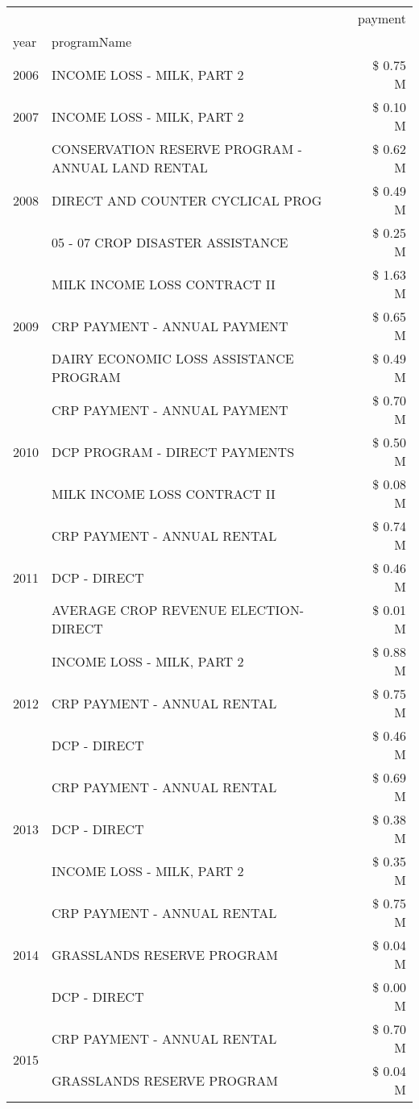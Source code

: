 \begin{tabular}{llr}
\toprule
 &  & payment \\
year & programName &  \\
\midrule
2006 & INCOME LOSS - MILK, PART 2 & \$ 0.75 M \\
\cline{1-3}
2007 & INCOME LOSS - MILK, PART 2 & \$ 0.10 M \\
\cline{1-3}
\multirow[t]{3}{*}{2008} & CONSERVATION RESERVE PROGRAM - ANNUAL LAND RENTAL & \$ 0.62 M \\
 & DIRECT AND COUNTER CYCLICAL PROG & \$ 0.49 M \\
 & 05 - 07 CROP DISASTER ASSISTANCE & \$ 0.25 M \\
\cline{1-3}
\multirow[t]{3}{*}{2009} & MILK INCOME LOSS CONTRACT II & \$ 1.63 M \\
 & CRP PAYMENT - ANNUAL PAYMENT & \$ 0.65 M \\
 & DAIRY ECONOMIC LOSS ASSISTANCE PROGRAM & \$ 0.49 M \\
\cline{1-3}
\multirow[t]{3}{*}{2010} & CRP PAYMENT - ANNUAL PAYMENT & \$ 0.70 M \\
 & DCP PROGRAM - DIRECT PAYMENTS & \$ 0.50 M \\
 & MILK INCOME LOSS CONTRACT II & \$ 0.08 M \\
\cline{1-3}
\multirow[t]{3}{*}{2011} & CRP PAYMENT - ANNUAL RENTAL & \$ 0.74 M \\
 & DCP - DIRECT & \$ 0.46 M \\
 & AVERAGE CROP REVENUE ELECTION-DIRECT & \$ 0.01 M \\
\cline{1-3}
\multirow[t]{3}{*}{2012} & INCOME LOSS - MILK, PART 2 & \$ 0.88 M \\
 & CRP PAYMENT - ANNUAL RENTAL & \$ 0.75 M \\
 & DCP - DIRECT & \$ 0.46 M \\
\cline{1-3}
\multirow[t]{3}{*}{2013} & CRP PAYMENT - ANNUAL RENTAL & \$ 0.69 M \\
 & DCP - DIRECT & \$ 0.38 M \\
 & INCOME LOSS - MILK, PART 2 & \$ 0.35 M \\
\cline{1-3}
\multirow[t]{3}{*}{2014} & CRP PAYMENT - ANNUAL RENTAL & \$ 0.75 M \\
 & GRASSLANDS RESERVE PROGRAM & \$ 0.04 M \\
 & DCP - DIRECT & \$ 0.00 M \\
\cline{1-3}
\multirow[t]{3}{*}{2015} & CRP PAYMENT - ANNUAL RENTAL & \$ 0.70 M \\
 & GRASSLANDS RESERVE PROGRAM & \$ 0.04 M \\

\end{tabular}
